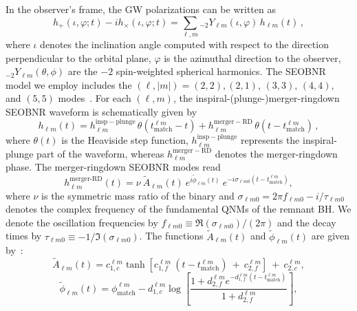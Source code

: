 \documentclass[twocolumn,prd,superscriptaddress,amsfonts,amssymb,amsmath,preprintnumbers]{revtex4-1}
\begin{document}
In the observer's frame, the GW polarizations can be written as 
%
\begin{equation}
h_+(\iota,\varphi;t ) - i h_\times(\iota,\varphi;t) = \sum_{\ell, m} {}_{-\!2}Y_{\ell m}(\iota,\varphi)\, h_{\ell m}(t)\,,
\end{equation}
%
where $\iota$ denotes the inclination angle computed with respect to the direction perpendicular to the orbital plane, $\varphi$ is the azimuthal direction to the observer, ${}_{-\!2}Y_{\ell m}(\theta,\phi)$ are the $-2$ spin-weighted spherical harmonics. The SEOBNR model we employ includes the $(\ell, |m|)=(2,2),(2,1)$, $(3,3)$, $(4,4)$, and $(5,5)$ modes~\cite{Cotesta:2018fcv}. For each $(\ell, m)$, the inspiral-(plunge-)merger-ringdown SEOBNR waveform is schematically given by
%
\begin{equation}
h_{\ell m}(t) = h_{\ell m}^\mathrm{insp-plunge}\, \theta(t_\mathrm{match}^{\ell m} - t) + h_{\ell m}^\mathrm{merger-RD}\,\theta(t-t_\mathrm{match}^{\ell m})\,,
\end{equation}
where $\theta(t)$ is the Heaviside step function, $h_{\ell m}^\mathrm{insp-plunge}$ represents the inspiral-plunge part of the waveform, whereas $h_{\ell m}^\mathrm{merger-RD}$ denotes the merger-ringdown phase.   
The merger-ringdown SEOBNR modes read~\citep{Bohe:2016gbl,Cotesta:2018fcv}
%
\begin{equation}
\label{RD}
h_{\ell m}^{\textrm{merger-RD}}(t) = \nu \ \tilde{A}_{\ell m}(t)\ e^{i \tilde{\phi}_{\ell m}(t)} \ e^{-i \sigma_{\ell m 0}(t-t_{\textrm{match}}^{\ell m})},
\end{equation}
%
where $\nu$ is the symmetric mass ratio of the binary and $\sigma_{\ell m0} = 2\pi f_{\ell m 0} -i/\tau_{\ell m 0}$ denotes the complex frequency of the fundamental QNMs of the remnant BH. We denote the oscillation frequencies by $f_{\ell m  0}\equiv \Re(\sigma_{\ell m0})/(2\pi)$ and the decay times by $\tau_{\ell m 0}\equiv -1/\Im(\sigma_{\ell m0}) $. 
The functions $\tilde{A}_{\ell m}(t)$ and $\tilde{\phi}_{\ell m}(t)$ are given by~\cite{Bohe:2016gbl,Cotesta:2018fcv}:
%
\begin{equation}
\label{eq:ansatz_amp}
\tilde{A}_{\ell m}(t) = c_{1,c}^{\ell m} \tanh[c_{1,f}^{\ell m}\ (t-t_{\textrm{match}}^{\ell m}) \ +\ c_{2,f}^{\ell m}] \ + \ c_{2,c}^{\ell m},
\end{equation}
%
\begin{equation}
\label{eq:ansatz_phase}
\tilde{\phi}_{\ell m}(t) = \phi_{\textrm{match}}^{\ell m} - d_{1,c}^{\ell m} \log\left[\frac{1+d_{2,f}^{\ell m} e^{-d_{1,f}^{\ell m}(t-t_{\textrm{match}}^{\ell m})}}{1+d_{2,f}^{\ell m}}\right],
\end{equation}
\end{document}
